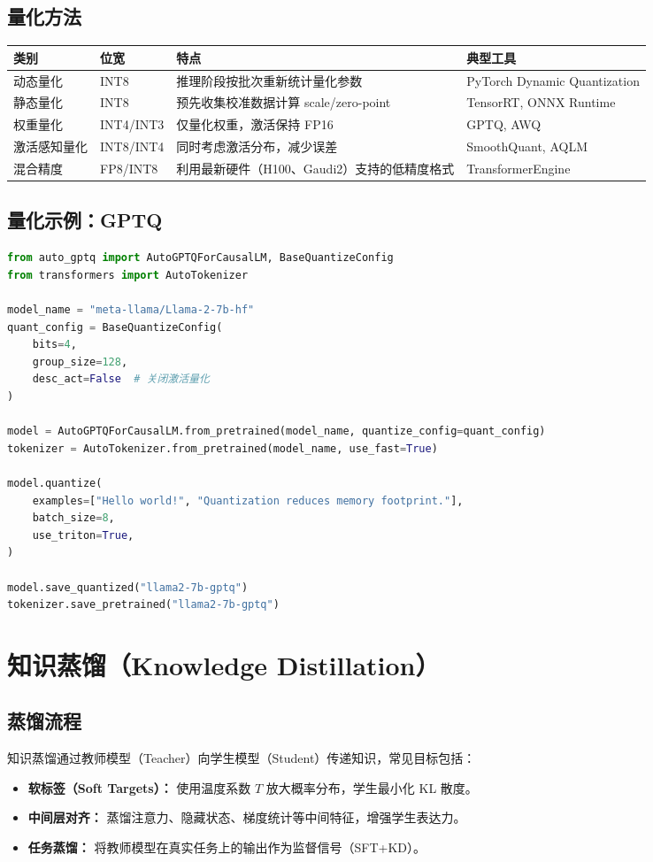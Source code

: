\documentclass[UTF8,zihao=-4]{ctexart}
\begin{document}
\subsection{量化方法}
\begin{longtable}{p{3cm}p{3cm}p{4cm}p{4cm}}
\toprule
类别 & 位宽 & 特点 & 典型工具 \\
\midrule
动态量化 & INT8 & 推理阶段按批次重新统计量化参数 & PyTorch Dynamic Quantization \\
静态量化 & INT8 & 预先收集校准数据计算 scale/zero-point & TensorRT, ONNX Runtime \\
权重量化 & INT4/INT3 & 仅量化权重，激活保持 FP16 & GPTQ, AWQ \\
激活感知量化 & INT8/INT4 & 同时考虑激活分布，减少误差 & SmoothQuant, AQLM \\
混合精度 & FP8/INT8 & 利用最新硬件（H100、Gaudi2）支持的低精度格式 & TransformerEngine \\
\bottomrule
\end{longtable}

\subsection{量化示例：GPTQ}
\begin{lstlisting}[language=Python,caption={使用 AutoGPTQ 对 LLaMA 权重量化}]
from auto_gptq import AutoGPTQForCausalLM, BaseQuantizeConfig
from transformers import AutoTokenizer

model_name = "meta-llama/Llama-2-7b-hf"
quant_config = BaseQuantizeConfig(
    bits=4,
    group_size=128,
    desc_act=False  # 关闭激活量化
)

model = AutoGPTQForCausalLM.from_pretrained(model_name, quantize_config=quant_config)
tokenizer = AutoTokenizer.from_pretrained(model_name, use_fast=True)

model.quantize(
    examples=["Hello world!", "Quantization reduces memory footprint."],
    batch_size=8,
    use_triton=True,
)

model.save_quantized("llama2-7b-gptq")
tokenizer.save_pretrained("llama2-7b-gptq")
\end{lstlisting}

\section{知识蒸馏（Knowledge Distillation）}
\subsection{蒸馏流程}
知识蒸馏通过教师模型（Teacher）向学生模型（Student）传递知识，常见目标包括：
\begin{itemize}
  \item \textbf{软标签（Soft Targets）：} 使用温度系数 $T$ 放大概率分布，学生最小化 KL 散度。
  \item \textbf{中间层对齐：} 蒸馏注意力、隐藏状态、梯度统计等中间特征，增强学生表达力。
  \item \textbf{任务蒸馏：} 将教师模型在真实任务上的输出作为监督信号（SFT+KD）。
\end{itemize}
\end{document}
